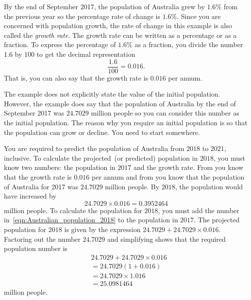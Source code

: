 \documentclass[a4paper,oneside,12pt]{article}
\begin{document}
\begin{solution}
By the end of September 2017, the population of Australia grew by
$1.6\%$ from the previous year so the percentage rate of change is
$1.6\%$.  Since you are concerned with population growth, the rate of
change in this example is also called the \emph{growth rate}.  The
growth rate can be written as a percentage or as a fraction.  To
express the percentage of $1.6\%$ as a fraction, you divide the number
$1.6$ by $100$ to get the decimal representation
\[
\frac{1.6}{100}
=
0.016.
\]
That is, you can also say that the growth rate is $0.016$ per annum.

The example does not explicitly state the value of the initial
population.  However, the example does say that the population of
Australia by the end of September 2017 was $24.7029$ million people so
you can consider this number as the initial population.  The reason
why you require an initial population is so that the population can
grow or decline.  You need to start somewhere.

You are required to predict the population of Australia from $2018$ to
$2021$, inclusive.  To calculate the projected~(or predicted)
population in $2018$, you must know two numbers: the population in
$2017$ and the growth rate.
From  you know that
the growth rate is $0.016$ per annum and
from  you
know that the population of Australia for 2017 was $24.7029$ million
people.  By $2018$, the population would have increased by
\begin{equation}
\label{eqn:Australian_population_2018}
24.7029 \times 0.016
=
0.3952464
\end{equation}
million people.  To calculate the population for $2018$, you must add
the number in~\eqref{eqn:Australian_population_2018} to the population
in $2017$.  The projected population for $2018$ is given by the
expression $24.7029 + 24.7029 \times 0.016$.  Factoring out the number
$24.7029$ and simplifying shows that the required population number is
\begin{equation}
\label{eqn:Australian_population_2018_calculation}
\begin{aligned}
&24.7029 + 24.7029 \times 0.016 \\[4pt]
&=
24.7029 (1 + 0.016) \\[4pt]
&=
24.7029 \times 1.016 \\[4pt]
&=
25.0981464
\end{aligned}
\end{equation}
million people.


\end{solution}
\end{document}
